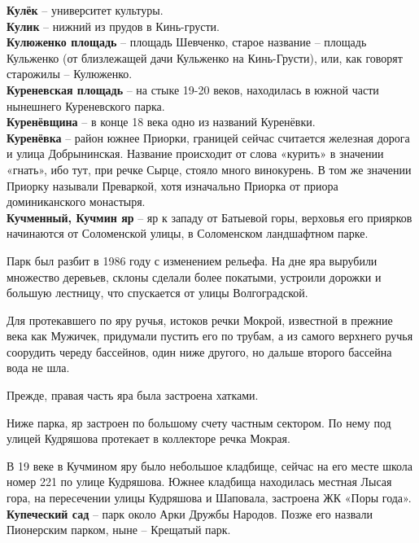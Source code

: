 \textbf{Кулёк} – университет культуры.\\

\textbf{Кулик} – нижний из прудов в Кинь-грусти.\\

\textbf{Кулюженко площадь} – площадь Шевченко, старое название – площадь Кульженко (от близлежащей дачи Кульженко на Кинь-Грусти), или, как говорят старожилы – Кулюженко.\\

\textbf{Куреневская площадь} – на стыке 19-20 веков, находилась в южной части нынешнего Куреневского парка.\\

\textbf{Куренёвщина} – в конце 18 века одно из названий Куренёвки.\\

\textbf{Куренёвка} – район южнее Приорки, границей сейчас считается железная дорога и улица Добрынинская. Название происходит от слова «курить» в значении «гнать», ибо тут, при речке Сырце, стояло много винокурень. В том же значении Приорку называли Преваркой, хотя изначально Приорка от приора доминиканского монастыря.\\

\textbf{Кучменный, Кучмин яр} – яр к западу от Батыевой горы, верховья его приярков начинаются от Соломенской улицы, в Соломенском ландшафтном парке.

Парк был разбит в 1986 году с изменением рельефа. На дне яра вырубили множество деревьев, склоны сделали более покатыми, устроили дорожки и большую лестницу, что спускается от улицы Волгоградской. 

Для протекавшего по яру ручья, истоков речки Мокрой, известной в прежние века как Мужичек, придумали пустить его по трубам, а из самого верхнего ручья соорудить череду бассейнов, один ниже другого, но дальше второго бассейна вода не шла.

Прежде, правая часть яра была застроена хатками.

Ниже парка, яр застроен по большому счету частным сектором. По нему под улицей Кудряшова протекает в коллекторе речка Мокрая. 

В 19 веке в Кучмином яру было небольшое кладбище, сейчас на его месте школа номер 221 по улице Кудряшова. Южнее кладбища находилась местная Лысая гора, на пересечении улицы Кудряшова и Шаповала, застроена ЖК «Поры года».\\

\textbf{Купеческий сад} – парк около Арки Дружбы Народов. Позже его назвали Пионерским парком, ныне – Крещатый парк.\\

